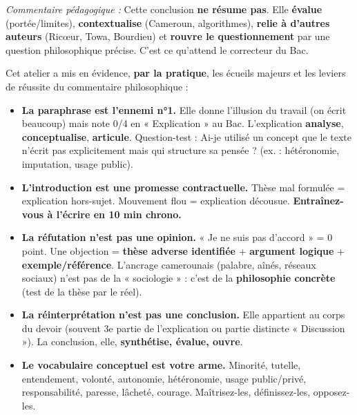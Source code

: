 \documentclass[11pt]{article}
\newcommand{\cle}[1]{{\popxbold\color{popdark}#1}}
\newcounter{popsec}
\newcounter{popsub}
\newcommand{\courssub}[1]{%
  \stepcounter{popsub}%
  \par\vspace{9pt}\noindent{\popxbold\fontsize{11.5}{13}\selectfont\color{popink}{\color{poporange}\thepopsec.\thepopsub}\hspace{6pt}#1}\par\nopagebreak\vspace{4pt}
}
\begin{document}
\begin{exoresolu}
\textit{Commentaire pédagogique :} Cette conclusion \textbf{ne résume pas}. Elle \textbf{évalue} (portée/limites), \textbf{contextualise} (Cameroun, algorithmes), \textbf{relie à d'autres auteurs} (Ricœur, Towa, Bourdieu) et \textbf{rouvre le questionnement} par une question philosophique précise. C'est ce qu'attend le correcteur du Bac.
\end{exoresolu}

\courssub{Bilan de l'activité}
Cet atelier a mis en évidence, \textbf{par la pratique}, les écueils majeurs et les leviers de réussite du commentaire philosophique :

\begin{aretenir}
\begin{itemize}
    \item \textbf{La paraphrase est l'ennemi n°1.} Elle donne l'illusion du travail (on écrit beaucoup) mais note 0/4 en « Explication » au Bac. L'explication \textbf{analyse}, \textbf{conceptualise}, \textbf{articule}. Question-test : \guillemotleft Ai-je utilisé un concept que le texte n'écrit pas explicitement mais qui structure sa pensée ? \guillemotright (ex. : \cle{hétéronomie}, \cle{imputation}, \cle{usage public}).
    \item \textbf{L'introduction est une promesse contractuelle.} Thèse mal formulée = explication hors-sujet. Mouvement flou = explication décousue. \textbf{Entraînez-vous à l'écrire en 10 min chrono.}
    \item \textbf{La réfutation n'est pas une opinion.} « Je ne suis pas d'accord » = 0 point. Une objection = \textbf{thèse adverse identifiée} + \textbf{argument logique} + \textbf{exemple/référence}. L'ancrage camerounais (palabre, aînés, réseaux sociaux) n'est pas de la « sociologie » : c'est de la \textbf{philosophie concrète} (test de la thèse par le réel).
    \item \textbf{La réinterprétation n'est pas une conclusion.} Elle appartient au corps du devoir (souvent 3e partie de l'explication ou partie distincte « Discussion »). La conclusion, elle, \textbf{synthétise, évalue, ouvre}.
    \item \textbf{Le vocabulaire conceptuel est votre arme.} \cle{Minorité}, \cle{tutelle}, \cle{entendement}, \cle{volonté}, \cle{autonomie}, \cle{hétéronomie}, \cle{usage public/privé}, \cle{responsabilité}, \cle{paresse}, \cle{lâcheté}, \cle{courage}. Maîtrisez-les, définissez-les, opposez-les.
\end{itemize}
\end{aretenir}
\end{document}
